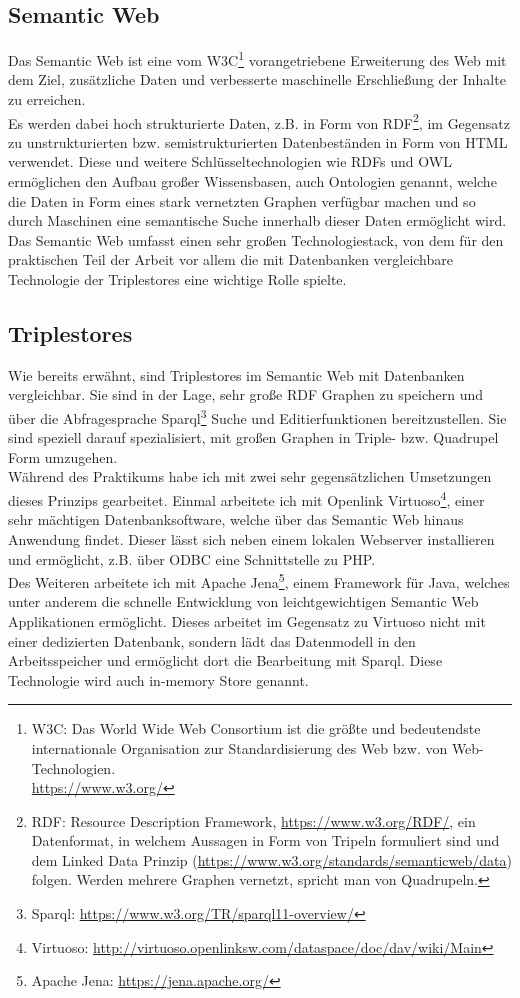 \documentclass{article}
\begin{document}
\subsection{Semantic Web}

Das Semantic Web ist eine vom W3C\footnote{W3C: Das World Wide Web Consortium ist die größte und bedeutendste internationale Organisation zur Standardisierung des Web bzw. von Web-Technologien.\\ \url{https://www.w3.org/} } vorangetriebene Erweiterung des Web mit dem Ziel, zusätzliche Daten und verbesserte maschinelle Erschließung der Inhalte zu erreichen.\\

Es werden dabei hoch strukturierte Daten, z.B. in Form von RDF\footnote{RDF: Resource Description Framework, \url{https://www.w3.org/RDF/}, ein Datenformat, in welchem Aussagen in Form von Tripeln formuliert sind und dem Linked Data Prinzip (\url{https://www.w3.org/standards/semanticweb/data}) folgen. Werden mehrere Graphen vernetzt, spricht man von Quadrupeln.}, im Gegensatz zu unstrukturierten bzw. semistrukturierten Datenbeständen in Form von HTML verwendet. Diese und weitere Schlüsseltechnologien wie RDFs und OWL ermöglichen den Aufbau großer Wissensbasen, auch Ontologien genannt, welche die Daten in Form eines stark vernetzten Graphen verfügbar machen und so durch Maschinen eine semantische Suche innerhalb dieser Daten ermöglicht wird.\\
Das Semantic Web umfasst einen sehr großen Technologiestack, von dem für den praktischen Teil der Arbeit vor allem die mit Datenbanken vergleichbare Technologie der Triplestores eine wichtige Rolle spielte.

\subsection{Triplestores}

Wie bereits erwähnt, sind Triplestores im Semantic Web mit Datenbanken vergleichbar. Sie sind in der Lage, sehr große RDF Graphen zu speichern und über die Abfragesprache Sparql\footnote{Sparql: \url{https://www.w3.org/TR/sparql11-overview/}} Suche und Editierfunktionen bereitzustellen. Sie sind speziell darauf spezialisiert, mit großen Graphen in Triple- bzw. Quadrupel Form umzugehen.\\
Während des Praktikums habe ich mit zwei sehr gegensätzlichen Umsetzungen dieses Prinzips gearbeitet. Einmal arbeitete ich mit Openlink Virtuoso\footnote{Virtuoso: \url{http://virtuoso.openlinksw.com/dataspace/doc/dav/wiki/Main}}, einer sehr mächtigen Datenbanksoftware, welche über das Semantic Web hinaus Anwendung findet. Dieser lässt sich neben einem lokalen Webserver installieren und ermöglicht, z.B. über ODBC eine Schnittstelle zu PHP.\\
Des Weiteren arbeitete ich mit Apache Jena\footnote{Apache Jena: \url{https://jena.apache.org/}}, einem Framework für Java, welches unter anderem die schnelle Entwicklung von leichtgewichtigen Semantic Web Applikationen ermöglicht. Dieses arbeitet im Gegensatz zu Virtuoso nicht mit einer dedizierten Datenbank, sondern lädt das Datenmodell in den Arbeitsspeicher und ermöglicht dort die Bearbeitung mit Sparql. Diese Technologie wird auch in-memory Store genannt.
\end{document}
